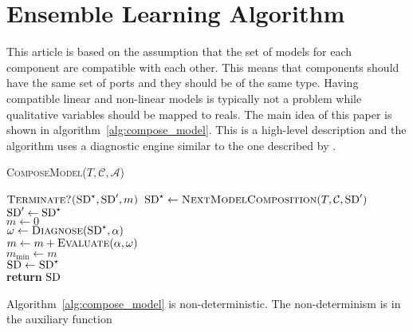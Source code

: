\section{Ensemble Learning Algorithm}
%
This article is based on the assumption that the set of models for
each component are compatible with each other. This means that
components should have the same set of ports and they should be of the
same type. Having compatible linear and non-linear models is typically
not a problem while qualitative variables should be mapped to
reals. The main idea of this paper is shown in
algorithm~\ref{alg:compose_model}. This is a high-level description
and the algorithm uses a diagnostic engine similar to the one
described by \cite{feldman13genius}.
%
\begin{algorithm}[htb]
\begin{footnotesize}
%
\caption{\textsc{ComposeModel}($T, \mathcal{C}, \mathcal{A}$)}
\label{alg:compose_model}
%
%
%
\vspace{0.075in}
%
\Repeat
{
$\textsc{Terminate?($\mathrm{SD}^\star, \mathrm{SD}^\prime, m$)}$
}
{
    $\mathrm{SD}^\star \gets \textsc{NextModelComposition}(T, \mathcal{C}, \mathrm{SD}^\prime)$\label{alg:next_model_composition}\\
    $\mathrm{SD}^\prime \gets \mathrm{SD}^\star$\\
    $m \gets 0$\\
    {
        $\omega \gets \textsc{Diagnose}(\mathrm{SD}^\star, \alpha)$\label{alg:diagnose}\\
        $m \gets m + \textsc{Evaluate}(\alpha, \omega)$\label{alg:evaluate}\\
    }
    {
        $m_{\min} \gets m$\\
        $\mathrm{SD} \gets \mathrm{SD}^\star$\label{alg:accept_end}\\
    }
}
\textbf{return} $\mathrm{SD}$
%
\end{footnotesize}
\end{algorithm}
%
\par
%
Algorithm~\ref{alg:compose_model} is non-deterministic. The
non-determinism is in the auxiliary function
